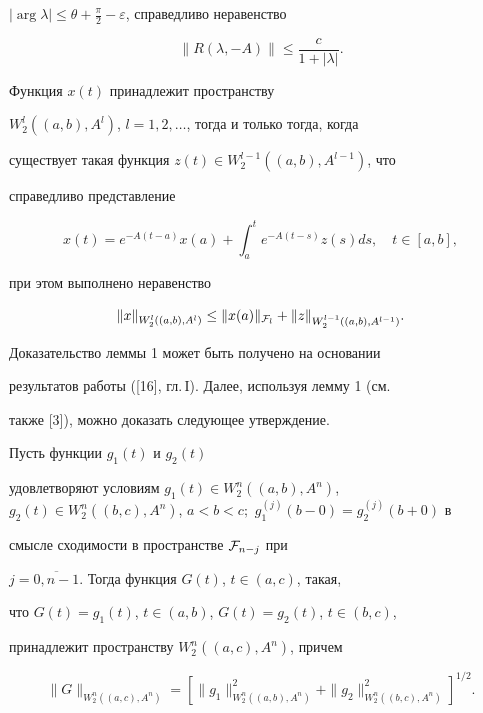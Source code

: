 $|\arg \lambda |\leq \theta


+\frac{\pi }{2}-\varepsilon$, справедливо неравенство


$$


\| R(\lambda ,-A)\| \leq\frac{c}{1+|\lambda |}.


$$





\begin{lem}


Функция $x(t)$ принадлежит пространству


$W^l_2((a,b),A^l)$, $l=1,2,\dotsc$, тогда и только тогда, когда


существует такая функция $z(t)\in W^{l-1}_2((a,b),A^{l-1})$, что


справедливо представление


$$


x(t)=e^{-A(t-a)}x(a)+\int_a^te^{-A(t-s )}z(s)ds, \quad t\in


[a,b],


$$


при этом выполнено неравенство


$$


\| x\|_{W^l_2((a,b),A^l)}\leq \|


x(a)\|_{{\pF}_{l}}+\| z\|_{W^{l-1}_2((a,b),A^{l-1})}.


$$


\end{lem}





Доказательство леммы 1 может быть получено на основании


результатов работы ([16], гл.\,I). Далее, используя лемму 1 (см.


также [3]), можно доказать следующее утверждение.





\begin{lem}


Пусть функции $g_1(t)$ и $g_2(t)$


удовлетворяют условиям $g_1(t)\in W^n_2((a,b),A^n)$, $g_2(t)\in


W^n_2((b,c),A^n)$, $a<b<c;$ $g_1^{(j)}(b-0)=g_2^{(j)}(b+0)$ в


смысле сходимости в пространстве ${{\cal F}}_{n-j}$ при


$j=\overline{0,n-1}$. Тогда функция $G(t)$, $t\in (a,c)$, такая,


что $G(t)=g_1(t)$, $t\in (a,b)$, $G(t)=g_2(t)$, $t\in (b,c)$,


принадлежит пространству $W^n_2((a,c),A^n)$, причем


$$ \| G\|


_{W^n_2((a,c),A^n)}=[\|g_1\|_{W^n_2((a,b),A^n)} ^2+ \| g_2\|


_{W^n_2((b,c),A^n)} ^2] ^{1/2}.


$$ 


\end{lem}





